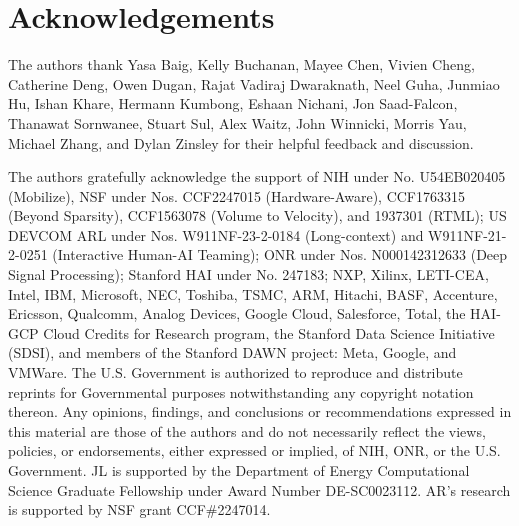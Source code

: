 \section*{Acknowledgements}
\label{sec:acknowledgements}

The authors thank Yasa Baig, Kelly Buchanan, Mayee Chen, Vivien Cheng, Catherine Deng, Owen Dugan, Rajat Vadiraj Dwaraknath, Neel Guha, Junmiao Hu, Ishan Khare, Hermann Kumbong, Eshaan Nichani, Jon Saad-Falcon, Thanawat Sornwanee, Stuart Sul, Alex Waitz, John Winnicki, Morris Yau, Michael Zhang, and Dylan Zinsley for their helpful feedback and discussion.

The authors gratefully acknowledge the support of NIH under No. U54EB020405 (Mobilize), NSF under Nos. CCF2247015 (Hardware-Aware), CCF1763315 (Beyond Sparsity), CCF1563078 (Volume to Velocity), and 1937301 (RTML); US DEVCOM ARL under Nos. W911NF-23-2-0184 (Long-context) and W911NF-21-2-0251 (Interactive Human-AI Teaming); ONR under Nos. N000142312633 (Deep Signal Processing); Stanford HAI under No. 247183; NXP, Xilinx, LETI-CEA, Intel, IBM, Microsoft, NEC, Toshiba, TSMC, ARM, Hitachi, BASF, Accenture, Ericsson, Qualcomm, Analog Devices, Google Cloud, Salesforce, Total, the HAI-GCP Cloud Credits for Research program, the Stanford Data Science Initiative (SDSI), and members of the Stanford DAWN project: Meta, Google, and VMWare. The U.S. Government is authorized to reproduce and distribute reprints for Governmental purposes notwithstanding any copyright notation thereon. Any opinions, findings, and conclusions or recommendations expressed in this material are those of the authors and do not necessarily reflect the views, policies, or endorsements, either expressed or implied, of NIH, ONR, or the U.S. Government.
JL is supported by the Department of Energy Computational Science Graduate Fellowship under Award Number DE-SC0023112.
AR's research is supported by NSF grant CCF\#2247014.
